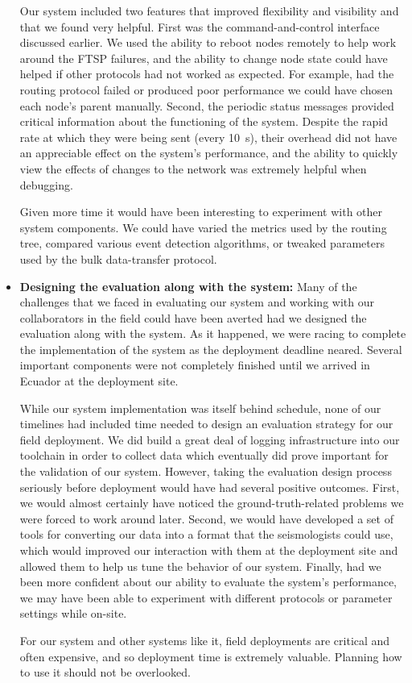\begin{itemize}
\hspace{0.25in} Our system included two features that improved flexibility
and visibility and that we found very helpful. First was the
command-and-control interface discussed earlier. We used the ability to
reboot nodes remotely to help work around the FTSP failures, and the ability
to change node state could have helped if other protocols had not worked as
expected. For example, had the routing protocol failed or produced poor
performance we could have chosen each node's parent manually. Second, the
periodic status messages provided critical information about the functioning
of the system. Despite the rapid rate at which they were being sent (every
10~s), their overhead did not have an appreciable effect on the system's
performance, and the ability to quickly view the effects of changes to the
network was extremely helpful when debugging.

\hspace{0.25in} Given more time it would have been interesting to experiment
with other system components. We could have varied the metrics used by the
routing tree, compared various event detection algorithms, or tweaked
parameters used by the bulk data-transfer protocol.

\item \textbf{Designing the evaluation along with the system:} Many of the
challenges that we faced in evaluating our system and working with our
collaborators in the field could have been averted had we designed the
evaluation along with the system. As it happened, we were racing to complete
the implementation of the system as the deployment deadline neared. Several
important components were not completely finished until we arrived in Ecuador
at the deployment site.

\hspace{0.25in} While our system implementation was itself behind schedule,
none of our timelines had included time needed to design an evaluation
strategy for our field deployment. We did build a great deal of logging
infrastructure into our toolchain in order to collect data which eventually
did prove important for the validation of our system. However, taking the
evaluation design process seriously before deployment would have had several
positive outcomes. First, we would almost certainly have noticed the
ground-truth-related problems we were forced to work around later. Second, we
would have developed a set of tools for converting our data into a format
that the seismologists could use, which would improved our interaction with
them at the deployment site and allowed them to help us tune the behavior of
our system. Finally, had we been more confident about our ability to evaluate
the system's performance, we may have been able to experiment with different
protocols or parameter settings while on-site.

\hspace{0.25in} For our system and other systems like it, field deployments
are critical and often expensive, and so deployment time is extremely
valuable. Planning how to use it should not be overlooked.

\end{itemize}

